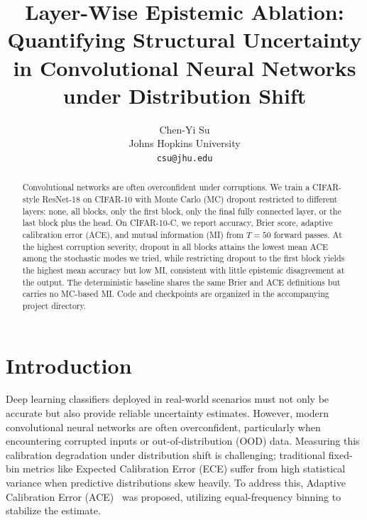 \documentclass[10pt,twocolumn,letterpaper]{article}
\begin{document}
\title{Layer-Wise Epistemic Ablation: Quantifying Structural Uncertainty \\ in Convolutional Neural Networks under Distribution Shift}

\author{Chen-Yi Su\\
Johns Hopkins University\\
{\tt\small csu@jhu.edu}
}

\maketitle

\begin{abstract}
Convolutional networks are often overconfident under corruptions. We train a CIFAR-style ResNet-18 on CIFAR-10 with Monte Carlo (MC) dropout restricted to different layers: none, all blocks, only the first block, only the final fully connected layer, or the last block plus the head. On CIFAR-10-C, we report accuracy, Brier score, adaptive calibration error (ACE), and mutual information (MI) from $T{=}50$ forward passes. At the highest corruption severity, dropout in all blocks attains the lowest mean ACE among the stochastic modes we tried, while restricting dropout to the first block yields the highest mean accuracy but low MI, consistent with little epistemic disagreement at the output. The deterministic baseline shares the same Brier and ACE definitions but carries no MC-based MI. Code and checkpoints are organized in the accompanying project directory.
\end{abstract}

\section{Introduction}

Deep learning classifiers deployed in real-world scenarios must not only be accurate but also provide reliable uncertainty estimates. However, modern convolutional neural networks are often overconfident, particularly when encountering corrupted inputs or out-of-distribution (OOD) data. Measuring this calibration degradation under distribution shift is challenging; traditional fixed-bin metrics like Expected Calibration Error (ECE) suffer from high statistical variance when predictive distributions skew heavily. To address this, Adaptive Calibration Error (ACE)~\cite{nixon2019measuring} was proposed, utilizing equal-frequency binning to stabilize the estimate.
\end{document}

